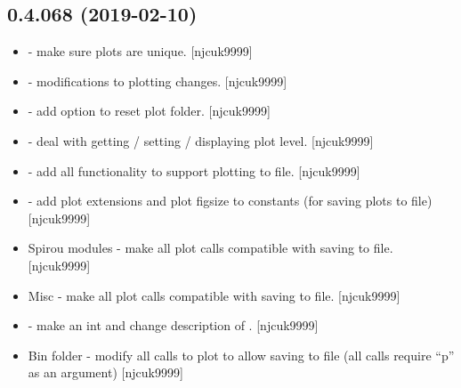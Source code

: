 \documentclass[a4paper,10pt,english]{report}
\begin{document}
\subsection{0.4.068 (2019-02-10)}
\label{\detokenize{misc/changelog:id190}}\begin{itemize}
\item {} 
 - make sure plots are unique. {[}njcuk9999{]}

\item {} 
 - modifications to plotting changes.
{[}njcuk9999{]}

\item {} 
 - add option to reset plot folder. {[}njcuk9999{]}

\item {} 
 - deal with getting / setting / displaying plot
level. {[}njcuk9999{]}

\item {} 
 - add all functionality to support plotting to file.
{[}njcuk9999{]}

\item {} 
 - add plot extensions and plot figsize to constants
(for saving plots to file) {[}njcuk9999{]}

\item {} 
Spirou modules - make all plot calls compatible with saving to file.
{[}njcuk9999{]}

\item {} 
Misc - make all plot calls compatible with saving to file. {[}njcuk9999{]}

\item {} 
 - make  an int and change description of
. {[}njcuk9999{]}

\item {} 
Bin folder - modify all calls to plot to allow saving to file (all
calls require “p” as an argument) {[}njcuk9999{]}

\end{itemize}
\end{document}
